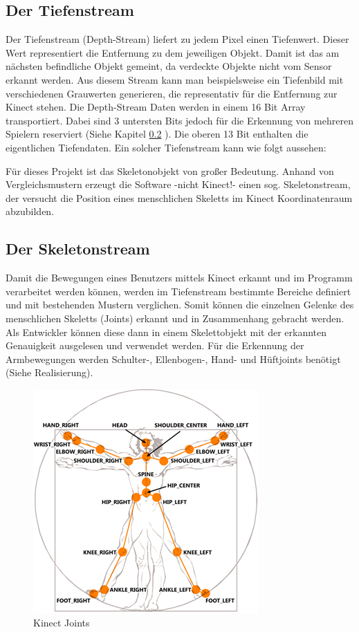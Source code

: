 \subsection{Der Tiefenstream}
Der Tiefenstream (Depth-Stream) liefert zu jedem Pixel einen Tiefenwert. Dieser Wert representiert
die Entfernung zu dem jeweiligen Objekt. Damit ist das am nächsten befindliche Objekt gemeint,
da verdeckte Objekte nicht vom Sensor erkannt werden.
Aus diesem Stream kann man beispielsweise ein Tiefenbild mit verschiedenen Grauwerten generieren, die representativ für die Entfernung zur Kinect stehen. Die Depth-Stream Daten werden in einem 16 Bit Array transportiert. Dabei sind 3 untersten Bits jedoch für die Erkennung von mehreren Spielern reserviert
(Siehe Kapitel \ref{skeleton} ). Die oberen 13 Bit enthalten die eigentlichen Tiefendaten. Ein solcher Tiefenstream kann wie folgt aussehen:


Für dieses Projekt ist das Skeletonobjekt von großer Bedeutung. Anhand von Vergleichsmustern erzeugt die Software -nicht Kinect!- einen sog. Skeletonstream, der versucht die Position eines menschlichen Skeletts im Kinect Koordinatenraum abzubilden.\cite{SWB-376536934}

\subsection{Der Skeletonstream}\label{skeleton}
Damit die Bewegungen eines Benutzers mittels Kinect erkannt und im Programm verarbeitet werden können, werden im Tiefenstream bestimmte Bereiche definiert und mit bestehenden Mustern verglichen. Somit können die einzelnen Gelenke des menschlichen Skeletts (Joints) erkannt und in Zusammenhang gebracht werden. Als Entwickler können diese dann in einem Skelettobjekt mit der erkannten Genauigkeit ausgelesen und verwendet werden. Für die Erkennung der Armbewegungen werden Schulter-, Ellenbogen-, Hand- und Hüftjoints benötigt (Siehe Realisierung).

\begin{figure}[H]						
	\centering							
	\includegraphics[scale=1.0]{Bilder/kinect_joints.png}			
	\caption{Kinect Joints \cite{ws:microsoft_jointType}}						
	\label{f:kinect_joints}						
\end{figure}



